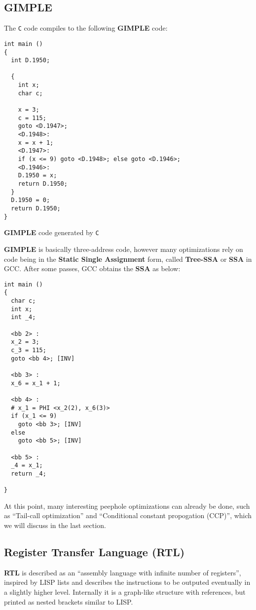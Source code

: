 \documentclass[11pt]{article}
\begin{document}
\subsection{GIMPLE}
\label{sec:orgb283b4c}
The \texttt{C} code compiles to the following \textbf{GIMPLE} code:
\begin{listing}[H]
\begin{verbatim}
int main ()
{
  int D.1950;

  {
    int x;
    char c;

    x = 3;
    c = 115;
    goto <D.1947>;
    <D.1948>:
    x = x + 1;
    <D.1947>:
    if (x <= 9) goto <D.1948>; else goto <D.1946>;
    <D.1946>:
    D.1950 = x;
    return D.1950;
  }
  D.1950 = 0;
  return D.1950;
}
\end{verbatim}
\caption{\textbf{GIMPLE} code generated by \texttt{C}}
\end{listing}

\textbf{GIMPLE} is basically three-address code, however many optimizations rely
on code being in the \textbf{Static Single Assignment} form, called
\textbf{Tree-SSA} or \textbf{SSA} in GCC. After some passes, GCC obtains the
\textbf{SSA} as below:

\begin{verbatim}
int main ()
{
  char c;
  int x;
  int _4;

  <bb 2> :
  x_2 = 3;
  c_3 = 115;
  goto <bb 4>; [INV]

  <bb 3> :
  x_6 = x_1 + 1;

  <bb 4> :
  # x_1 = PHI <x_2(2), x_6(3)>
  if (x_1 <= 9)
    goto <bb 3>; [INV]
  else
    goto <bb 5>; [INV]

  <bb 5> :
  _4 = x_1;
  return _4;

}
\end{verbatim}
At this point, many interesting peephole optimizations can already be done, such
 as ``Tail-call optimization'' and ``Conditional constant propogation (CCP)'', which
 we will discuss in the last section.

\subsection{Register Transfer Language (RTL)}
\label{sec:org4eee840}
\textbf{RTL} is described as an ``assembly language with infinite number of
registers'', inspired by LISP lists and describes the instructions to be
outputed eventually in a slightly higher level. Internally it is a graph-like
structure with references, but printed as nested brackets similar to LISP.
\end{document}
